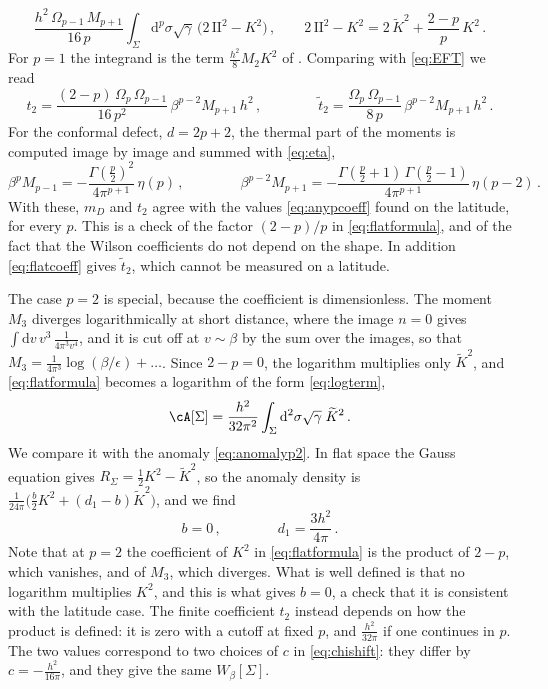 \documentclass[a4paper,11pt]{article}
\newcommand{\II}{\mathrm{I\!I}}
\newcommand{\Kt}{\widetilde{K}}
\newcommand{\dd}{\mathrm{d}}
\begin{document}
	\begin{equation}\label{eq:flatformula}
		\frac{h^2\,\Omega_{p-1}\,M_{p+1}}{16\,p}\int_\Sigma\dd^p\sigma\sqrt\gamma\,\bigl(2\,\II^2-K^2\bigr)\, ,\qquad 2\,\II^2-K^2=2\,\Kt^2+\frac{2-p}{p}\,K^2\, .
	\end{equation}
	For $p=1$ the integrand is the term $\tfrac{h^2}{8}M_2K^2$ of \cite{BMP}. Comparing with \eqref{eq:EFT} we read
	\begin{equation}\label{eq:flatcoeff}
		t_2=\frac{(2-p)\,\Omega_p\,\Omega_{p-1}}{16\,p^2}\,\beta^{p-2}M_{p+1}\,h^2\, ,\qquad\qquad
		\tilde t_2=\frac{\Omega_p\,\Omega_{p-1}}{8\,p}\,\beta^{p-2}M_{p+1}\,h^2\, .
	\end{equation}
	For the conformal defect, $d=2p+2$, the thermal part of the moments is computed image by image and summed with \eqref{eq:eta},
	\begin{equation}
		\beta^{p}M_{p-1}=-\frac{\Gamma(\frac p2)^2}{4\pi^{p+1}}\,\eta(p)\, ,\qquad\qquad
		\beta^{p-2}M_{p+1}=-\frac{\Gamma(\frac p2+1)\,\Gamma(\frac p2-1)}{4\pi^{p+1}}\,\eta(p-2)\, .
	\end{equation}
	With these, $m_D$ and $t_2$ agree with the values \eqref{eq:anypcoeff} found on the latitude, for every $p$. This is a check of the factor $(2-p)/p$ in \eqref{eq:flatformula}, and of the fact that the Wilson coefficients do not depend on the shape. In addition \eqref{eq:flatcoeff} gives $\tilde t_2$, which cannot be measured on a latitude.
	
The case $p=2$ is special, because the coefficient is dimensionless. The moment $M_3$ diverges logarithmically at short distance, where the image $n=0$ gives $\int\dd v\,v^3\,\tfrac{1}{4\pi^3v^4}$, and it is cut off at $v\sim\beta$ by the sum over the images, so that $M_3=\tfrac{1}{4\pi^3}\log(\beta/\epsilon)+\dots$. Since $2-p=0$, the logarithm multiplies only $\Kt^2$, and \eqref{eq:flatformula} becomes a logarithm of the form \eqref{eq:logterm},
	\begin{equation}\label{eq:Ascalar}
		\cA[\Sigma]=\frac{h^2}{32\pi^2}\int_\Sigma\dd^2\sigma\sqrt\gamma\;\Kt^2\, .
	\end{equation}
	We compare it with the anomaly \eqref{eq:anomalyp2}. In flat space the Gauss equation gives $R_\Sigma=\tfrac12K^2-\Kt^2$, so the anomaly density is $\tfrac{1}{24\pi}\bigl(\tfrac b2K^2+(d_1-b)\Kt^2\bigr)$, and we find
	\begin{equation}
		b=0\, ,\qquad\qquad d_1=\frac{3h^2}{4\pi}\, .
	\end{equation}
Note that at $p=2$ the coefficient of $K^2$ in \eqref{eq:flatformula} is the product of $2-p$, which vanishes, and of $M_3$, which diverges. What is well defined is that no logarithm multiplies $K^2$, and this is what gives $b=0$, a check that it is consistent with the latitude case. The finite coefficient $t_2$ instead depends on how the product is defined: it is zero with a cutoff at fixed $p$, and $\tfrac{h^2}{32\pi}$ if one continues in $p$. The two values correspond to two choices of $c$ in \eqref{eq:chishift}: they differ by $c=-\tfrac{h^2}{16\pi}$, and they give the same $W_\beta[\Sigma]$.
	
\end{document}

